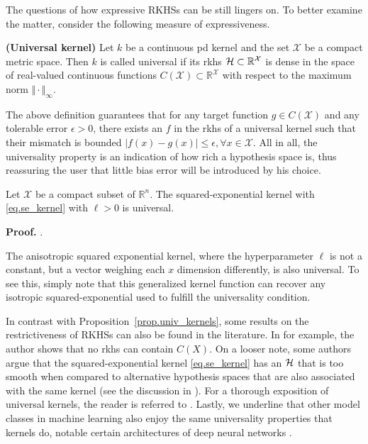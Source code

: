 The questions of how expressive RKHSs can be still lingers on. To better examine the matter, consider the following measure of expressiveness.

\begin{definition}
	\textbf{(Universal kernel)}
	\label{def.universal_kernel}
	Let $k$ be a continuous \ac{pd} kernel and the set $\mathcal{X}$ be a compact metric space. Then $k$ is called universal if its \ac{rkhs} $\mathcal{H} \subset \mathbb{R}^\mathcal{X}$ is dense in the space of real-valued continuous functions $C(\mathcal{X}) \subset \mathbb{R}^\mathcal{X}$ with respect to the maximum norm $\Vert \cdot \Vert_\infty$.
\end{definition}

The above definition guarantees that for any target function $g \in C(\mathcal{X})$ and any tolerable error $\epsilon > 0$, there exists an $f$ in the \ac{rkhs} of a universal kernel such that their mismatch is bounded $| f(x) - g(x) | \leq \epsilon, \forall x \in \mathcal{X}$.
All in all, the universality property is an indication of how rich a hypothesis space is, thus reassuring the user that little bias error will be introduced by his choice.

\begin{proposition}
	\label{prop.univ_kernels}
	Let $\mathcal{X}$ be a compact subset of $\mathbb{R}^n$. The squared-exponential kernel with \eqref{eq.se_kernel} with $\ell >0$ is universal.
\end{proposition}

\vspace{-8pt}
\begin{my_proof}
	\textbf{Proof.}
	\cite[Corollary~4.58]{steinwart2008svm_book}.
\end{my_proof}

\begin{remark}
	The anisotropic squared exponential kernel, where the hyperparameter $\ell$ is not a constant, but a vector weighing each $x$ dimension differently, is also universal. To see this, simply note that this generalized kernel function can recover any isotropic squared-exponential used to fulfill the universality condition.%
\end{remark}

In contrast with Proposition~\ref{prop.univ_kernels}, some results on the restrictiveness of RKHSs can also be found in the literature. In \cite{steinwart2020_no_rkhs_cont_func} for example, the author shows that no \ac{rkhs} can contain $C(X)$. On a looser note, some authors argue that the squared-exponential kernel \eqref{eq.se_kernel} has an $\mathcal{H}$ that is too smooth when compared to alternative hypothesis spaces that are also associated with the same kernel (see the discussion in \cite[§4]{kanagawa2018gaussian}). For a thorough exposition of universal kernels, the reader is referred to \cite{micchelli2006universal}. Lastly, we underline that other model classes in machine learning also enjoy the same universality properties that kernels do, notable certain architectures of deep neural networks \citep{kidger2020universal}.


